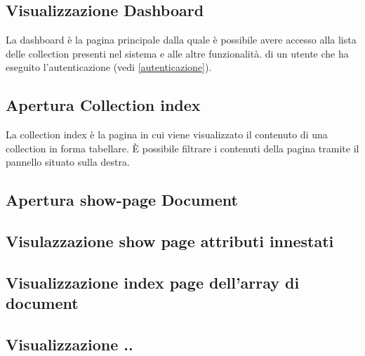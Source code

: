 	\subsection{Visualizzazione Dashboard} %
	\label{visualizzazionedashboard}
	La dashboard è la pagina principale dalla quale è possibile avere accesso alla lista delle collection presenti nel sistema e alle altre funzionalità.
	di un utente che ha eseguito l'autenticazione (vedi \ref{autenticazione}).
	

	\subsection{Apertura Collection index} %
	\label{aprturacollectionindex}
	La collection index è la pagina in cui viene visualizzato il contenuto di una collection in forma tabellare. \`E possibile filtrare i contenuti della pagina tramite il pannello situato sulla destra.

	\subsection{Apertura show-page Document} %

	\subsection{Visulazzazione show page attributi innestati} %

	\subsection{Visualizzazione index page dell'array di document} %




	





	\subsection{Visualizzazione ..}
	

